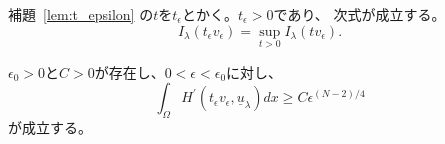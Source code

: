 \begin{nota}
 補題~\ref{lem:t_epsilon}
 の$t$を$t_\epsilon$とかく。$t_\epsilon > 0$であり、
 次式が成立する。
 \begin{equation}
  I_\lambda(t_\epsilon v_\epsilon) = \sup_{t > 0} I_\lambda(t
   v_\epsilon).
   \label{eq:t_epsilon}
 \end{equation}
\end{nota}

\begin{lem} \label{lem:intHprime}
 $\epsilon_0 > 0$と$C > 0$が存在し、$0 < \epsilon < \epsilon_0$に対し、
 \begin{equation}
  \int_\Omega H^\prime(t_\epsilon v_\epsilon, \underline{u}_\lambda)
   dx \geq C\epsilon^{(N-2)/4} \label{eq:int_Hprime}
 \end{equation}
 が成立する。
\end{lem}

